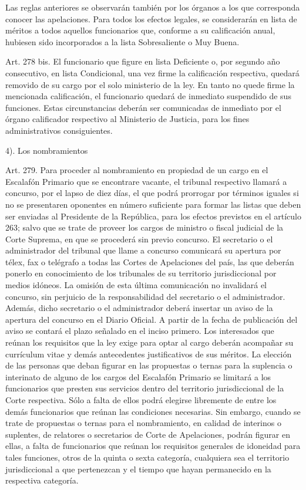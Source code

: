     Las reglas anteriores se observarán también por los órganos a los que corresponda conocer las apelaciones.
    Para todos los efectos legales, se considerarán en lista de méritos a todos aquellos funcionarios que, conforme a su calificación anual, hubiesen sido incorporados a la lista Sobresaliente o Muy Buena.

    Art. 278 bis. El funcionario que figure en lista Deficiente o, por segundo año consecutivo, en lista Condicional, una vez firme la calificación respectiva, quedará removido de su cargo por el solo ministerio de la ley. En tanto no quede firme la mencionada calificación, el funcionario quedará de inmediato suspendido de sus funciones.
    Estas circunstancias deberán ser comunicadas de inmediato por el órgano calificador respectivo al Ministerio de Justicia, para los fines administrativos consiguientes.


    4). Los nombramientos


    Art. 279. Para proceder al nombramiento en propiedad de un cargo en el Escalafón Primario que se encontrare vacante, el tribunal respectivo llamará a concurso, por el lapso de diez días, el que podrá prorrogar por términos iguales si no se presentaren oponentes en número suficiente para formar las listas que deben ser enviadas al Presidente de la República, para los efectos previstos en el artículo 263; salvo que se trate de proveer los cargos de ministro o fiscal judicial de la Corte Suprema, en que se procederá sin previo concurso.
    El secretario o el administrador del tribunal que llame a concurso comunicará su apertura por télex, fax o telégrafo a todas las Cortes de Apelaciones del país, las que deberán ponerlo en conocimiento de los tribunales de su territorio jurisdiccional por medios idóneos. La omisión de esta última comunicación no invalidará el concurso, sin perjuicio de la responsabilidad del secretario o el administrador. Además, dicho secretario o el administrador deberá insertar un aviso de la apertura del concurso en el Diario Oficial. A partir de la fecha de publicación del aviso se contará el plazo señalado en el inciso primero.
    Los interesados que reúnan los requisitos que la ley exige para optar al cargo deberán acompañar su currículum vitae y demás antecedentes justificativos de sus méritos.
    La elección de las personas que deban figurar en las propuestas o ternas para la suplencia o interinato de alguno de los cargos del Escalafón Primario se limitará a los funcionarios que presten sus servicios dentro del territorio jurisdiccional de la Corte respectiva. Sólo a falta de ellos podrá elegirse libremente de entre los demás funcionarios que reúnan las condiciones necesarias.
    Sin embargo, cuando se trate de propuestas o ternas para el nombramiento, en calidad de interinos o suplentes, de relatores o secretarios de Corte de Apelaciones, podrán figurar en ellas, a falta de funcionarios que reúnan los requisitos generales de idoneidad para tales funciones, otros de la quinta o sexta categoría, cualquiera sea el territorio jurisdiccional a que pertenezcan y el tiempo que hayan permanecido en la respectiva categoría.


